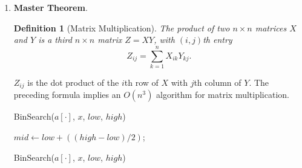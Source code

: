 \documentclass[12pt,a4paper]{article}
\newtheorem{definition}{Definition}
\theoremstyle{definition}
\begin{document}
\begin{enumerate}
\item  \textbf{Master Theorem}.

\begin{definition}[Matrix Multiplication]
The product of two $n \times n$ matrices $X$ and $Y$ is a third $n \times n$ matrix $Z = XY$, with $(i,j)$th entry
$$Z_{ij}=\sum_{k=1}^{n}X_{ik}Y_{kj}.$$
\end{definition}
$Z_{ij}$ is the dot product of the $i$th row of $X$ with $j$th column of $Y$. The preceding formula implies an $O(n^3)$ algorithm for matrix multiplication.

\begin{minipage}[t]{0.49\textwidth}
\begin{algorithm}[H]
	\BlankLine
	\caption{BinSearch($a[\cdot]$, $x$, $low$, $high$)} \label{Alg-RecursiveBS}
	\BlankLine
    $mid \leftarrow low +((high - low) / 2)$;
    
    
\end{algorithm}
\end{minipage}
\begin{minipage}[t]{0.455\textwidth}
\begin{algorithm}[H]
\BlankLine
	\caption{BinSearch($a[\cdot]$, $x$, $low$, $high$)} \label{Alg-NonRecursiveBS}
		
	\BlankLine	
\end{algorithm}
\end{minipage}
\end{enumerate}
\end{document}
